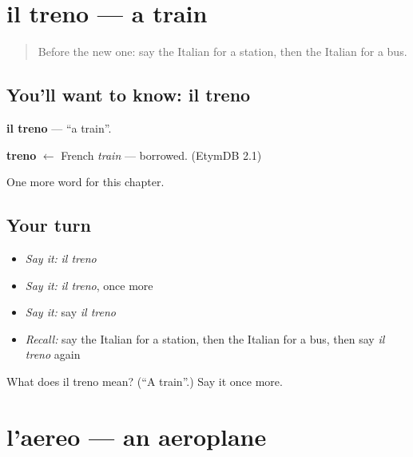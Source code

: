 \section[il treno]{il treno — a train}

\label{lesson:IT-C82-treno}



\begin{quote}
Before the new one: say the Italian for a station, then the Italian for a bus.
\end{quote}

\subsection*{You'll want to know: il treno}
\textbf{il treno} — \textquotedblleft{}a train\textquotedblright{}.

\begin{cousinweb}
\textbf{treno} $\leftarrow$ French \emph{train} — borrowed. (EtymDB 2.1)
\end{cousinweb}

\begin{grammarlens}[title={What you've built}]
One more word for this chapter.
\end{grammarlens}

\subsection*{Your turn}
\begin{itemize}
\raggedright
  \item \emph{Say it:} \emph{il treno}
  \item \emph{Say it:} \emph{il treno}, once more
  \item \emph{Say it:} say \emph{il treno}
  \item \emph{Recall:} say the Italian for a station, then the Italian for a bus, then say \emph{il treno} again
\end{itemize}

\begin{tcolorbox}[breakable,colback=teal!4,colframe=teal!35!black,title={Before you move on}]
What does il treno mean? (\textquotedblleft{}A train\textquotedblright{}.) Say it once more.
\end{tcolorbox}
\section[l'aereo]{l'aereo — an aeroplane}

